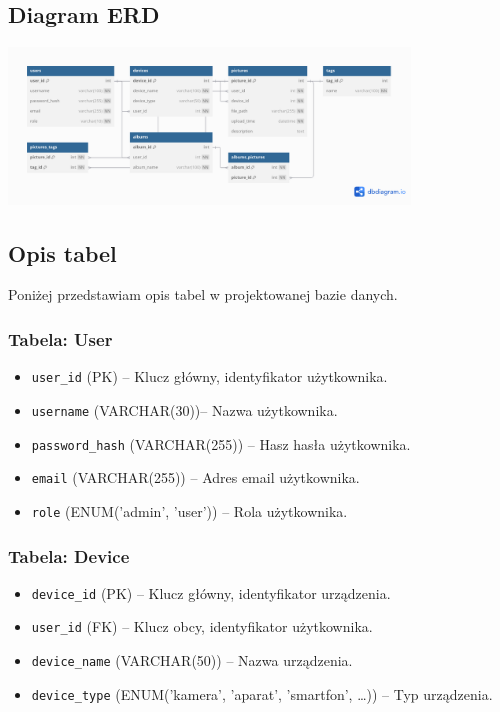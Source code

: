 \documentclass[12pt,a4paper]{article}
\begin{document}
\subsection{Diagram ERD}
\begin{center}
    \includegraphics[width=0.8\textwidth]{diagram.png}
\end{center}

\subsection{Opis tabel}
Poniżej przedstawiam opis tabel w projektowanej bazie danych.

\subsubsection{Tabela: User}
\begin{itemize}
    \item \texttt{user\_id} (PK) -- Klucz główny, identyfikator użytkownika.
    \item \texttt{username} (VARCHAR(30))-- Nazwa użytkownika.
    \item \texttt{password\_hash} (VARCHAR(255)) -- Hasz hasła użytkownika.
    \item \texttt{email} (VARCHAR(255)) -- Adres email użytkownika.
    \item \texttt{role} (ENUM('admin', 'user')) -- Rola użytkownika.
\end{itemize}

\subsubsection{Tabela: Device}
\begin{itemize}
    \item \texttt{device\_id} (PK) -- Klucz główny, identyfikator urządzenia.
    \item \texttt{user\_id} (FK) -- Klucz obcy, identyfikator użytkownika.
    \item \texttt{device\_name} (VARCHAR(50)) -- Nazwa urządzenia.
    \item \texttt{device\_type} (ENUM('kamera', 'aparat', 'smartfon', \dots)) -- Typ urządzenia.
\end{itemize}
\end{document}
